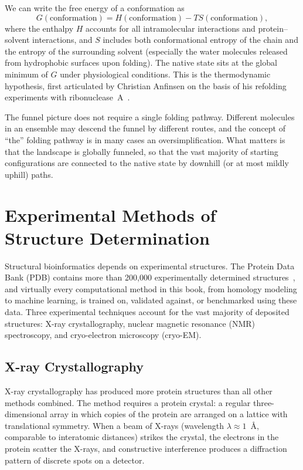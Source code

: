 We can write the free energy of a conformation as
\begin{equation}
  G(\text{conformation}) = H(\text{conformation}) - TS(\text{conformation}),
  \label{eq:folding-free-energy}
\end{equation}
where the enthalpy $H$ accounts for all intramolecular interactions and protein--solvent interactions, and $S$ includes both conformational entropy of the chain and the entropy of the surrounding solvent (especially the water molecules released from hydrophobic surfaces upon folding).  The native state sits at the global minimum of $G$ under physiological conditions.  This is the thermodynamic hypothesis, first articulated by Christian Anfinsen on the basis of his refolding experiments with ribonuclease~A~\cite{anfinsen1973}.

The funnel picture does not require a single folding pathway.  Different molecules in an ensemble may descend the funnel by different routes, and the concept of ``the'' folding pathway is in many cases an oversimplification.  What matters is that the landscape is globally funneled, so that the vast majority of starting configurations are connected to the native state by downhill (or at most mildly uphill) paths.


\section{Experimental Methods of Structure Determination}
\label{sec:experiments}

Structural bioinformatics depends on experimental structures.  The Protein Data Bank (PDB) contains more than 200{,}000 experimentally determined structures~\cite{burley2023}, and virtually every computational method in this book, from homology modeling to machine learning, is trained on, validated against, or benchmarked using these data.  Three experimental techniques account for the vast majority of deposited structures: X-ray crystallography, nuclear magnetic resonance (NMR) spectroscopy, and cryo-electron microscopy (cryo-EM).

\subsection{X-ray Crystallography}
\label{sec:xray}

X-ray crystallography has produced more protein structures than all other methods combined.  The method requires a protein crystal: a regular three-dimensional array in which copies of the protein are arranged on a lattice with translational symmetry.  When a beam of X-rays (wavelength $\lambda \approx 1$~\AA, comparable to interatomic distances) strikes the crystal, the electrons in the protein scatter the X-rays, and constructive interference produces a diffraction pattern of discrete spots on a detector.

